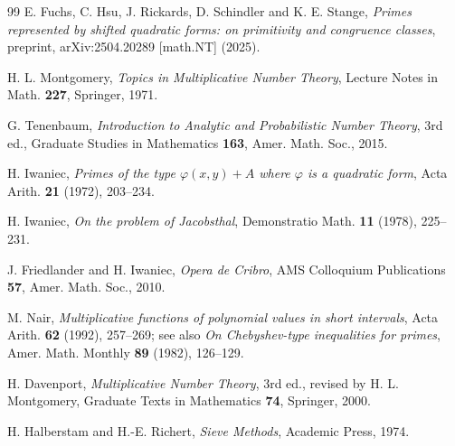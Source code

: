 \documentclass[11pt, a4paper]{article}
\theoremstyle{plain}
\theoremstyle{definition}
\begin{document}
\begin{thebibliography}{99}
 E. Fuchs, C. Hsu, J. Rickards, D. Schindler and K. E. Stange, \textit{Primes represented by shifted quadratic forms: on primitivity and congruence classes}, preprint, arXiv:2504.20289 [math.NT] (2025).

 H. L. Montgomery, \textit{Topics in Multiplicative Number Theory}, Lecture Notes in Math. \textbf{227}, Springer, 1971.

 G. Tenenbaum, \textit{Introduction to Analytic and Probabilistic Number Theory}, 3rd ed., Graduate Studies in Mathematics \textbf{163}, Amer. Math. Soc., 2015.

 H. Iwaniec, \textit{Primes of the type $\varphi(x,y)+A$ where $\varphi$ is a quadratic form}, Acta Arith. \textbf{21} (1972), 203--234.

 H. Iwaniec, \textit{On the problem of Jacobsthal}, Demonstratio Math. \textbf{11} (1978), 225--231.

 J. Friedlander and H. Iwaniec, \textit{Opera de Cribro}, AMS Colloquium Publications \textbf{57}, Amer. Math. Soc., 2010.

 M. Nair, \textit{Multiplicative functions of polynomial values in short intervals}, Acta Arith. \textbf{62} (1992), 257--269; see also \textit{On Chebyshev-type inequalities for primes}, Amer. Math. Monthly \textbf{89} (1982), 126--129.

 H. Davenport, \textit{Multiplicative Number Theory}, 3rd ed., revised by H. L. Montgomery, Graduate Texts in Mathematics \textbf{74}, Springer, 2000.

 H. Halberstam and H.-E. Richert, \textit{Sieve Methods}, Academic Press, 1974.

\end{thebibliography}
\end{document}
